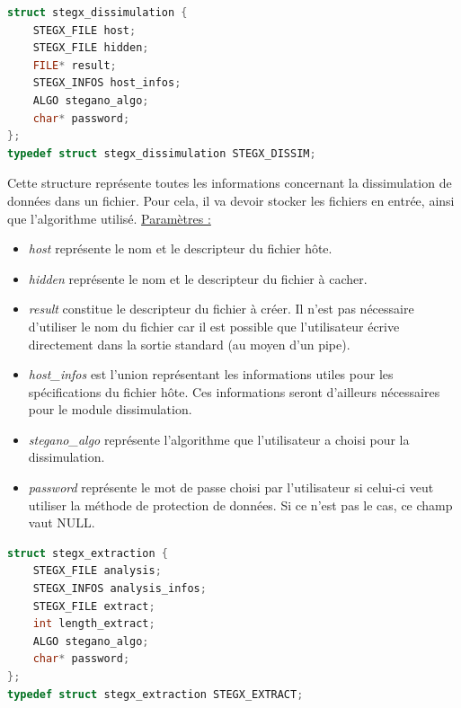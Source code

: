 \documentclass[11pt]{article}
\begin{document}
\begin{lstlisting}[language=c]
struct stegx_dissimulation {
    STEGX_FILE host;
    STEGX_FILE hidden;
    FILE* result;
    STEGX_INFOS host_infos;
    ALGO stegano_algo;
    char* password;
};
typedef struct stegx_dissimulation STEGX_DISSIM;
\end{lstlisting}

Cette structure représente toutes les informations concernant la dissimulation 
de données dans un fichier. Pour cela, il va devoir stocker les fichiers en 
entrée, ainsi que l'algorithme utilisé. \newline
\underline{Paramètres :} 
\begin{itemize}
\item \textit{host} représente le nom et le descripteur du fichier hôte.  
\item \textit{hidden} représente le nom et le descripteur du fichier à cacher. 
\item \textit{result} constitue le descripteur du fichier à créer. Il n'est pas 
nécessaire d'utiliser le nom du fichier car il est possible que l'utilisateur 
écrive directement dans la sortie standard (au moyen d'un pipe).
\item \textit{host\_infos} est l'union représentant les informations utiles pour 
les spécifications du fichier hôte. Ces informations seront d'ailleurs 
nécessaires pour le module dissimulation. 
\item \textit{stegano\_algo} représente l'algorithme que l'utilisateur a choisi 
pour la dissimulation. 
\item \textit{password} représente le mot de passe choisi par l'utilisateur si 
celui-ci veut utiliser la méthode de protection de données. Si ce n'est 
pas le cas, ce champ vaut NULL.
\newline
\end{itemize}

\begin{lstlisting}[language=c]
struct stegx_extraction {
    STEGX_FILE analysis;
    STEGX_INFOS analysis_infos;
    STEGX_FILE extract;
    int length_extract;
    ALGO stegano_algo;
    char* password;
};
typedef struct stegx_extraction STEGX_EXTRACT;
\end{lstlisting}
\end{document}

